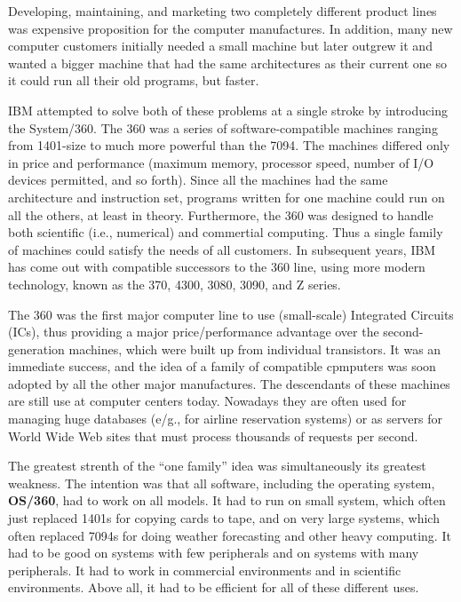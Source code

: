 \documentclass{book}
\newcommand {\kw}  [1] {\textbf{#1}}
\begin{document}
Developing, maintaining, and marketing two completely different product lines was expensive proposition for the computer manufactures.
In addition, many new computer customers initially needed a small machine but later outgrew it and wanted a bigger machine 
that had the same architectures as their current one so it could run all their old programs, but faster.

IBM attempted to solve both of these problems at a single stroke by introducing the System/360.
The 360 was a series of software-compatible machines ranging from 1401-size to much more powerful than the 7094.
The machines differed only in price and performance (maximum memory, processor speed, number of I/O devices permitted, and so forth).
Since all the machines had the same architecture and instruction set, programs written for one machine could run on all the others, at least in theory.
Furthermore, the 360 was designed to handle both scientific (i.e., numerical) and commertial computing.
Thus a single family of machines could satisfy the needs of all customers.
In subsequent years, IBM has come out with compatible successors to the 360 line, using more modern technology, 
known as the 370, 4300, 3080, 3090, and Z series.

The 360 was the first major computer line to use (small-scale) Integrated Circuits (ICs), 
thus providing a major price/performance advantage over the second-generation machines, which were built up from individual transistors.
It was an immediate success, and the idea of a family of compatible cpmputers was soon adopted by all the other major manufactures.
The descendants of these machines are still use at computer centers today.
Nowadays they are often used for managing huge databases (e/g., for airline reservation systems) 
or as servers for World Wide Web sites that must process thousands of requests per second.

The greatest strenth of the ``one family'' idea was simultaneously its greatest weakness.
The intention was that all software, including the operating system, \kw{OS/360}, had to work on all models.
It had to run on small system, which often just replaced 1401s for copying cards to tape, 
and on very large systems, which often replaced 7094s for doing weather forecasting and other heavy computing.
It had to be good on systems with few peripherals and on systems with many peripherals.
It had to work in commercial environments and in scientific environments.
Above all, it had to be efficient for all of these different uses.
\end{document}
